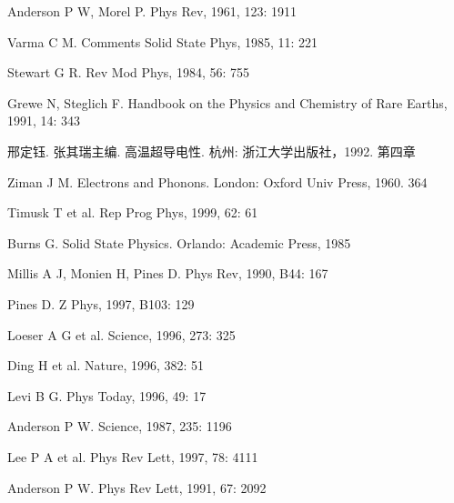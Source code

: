 \begin{canKao}
\begin{enumerate}[label={[\arabic*]}, leftmargin=2.2em, itemsep=0pt]
\item Anderson P W, Morel P. Phys Rev, 1961, 123: 1911
\item Varma C M. Comments Solid State Phys, 1985, 11: 221
\item Stewart G R. Rev Mod Phys, 1984, 56: 755
\item Grewe N, Steglich F. Handbook on the Physics and Chemistry of Rare Earths, 1991, 14: 343
\item 邢定钰. 张其瑞主编. 高温超导电性. 杭州: 浙江大学出版社，1992. 第四章
\item Ziman J M. Electrons and Phonons. London: Oxford Univ Press, 1960. 364
\item Timusk T et al. Rep Prog Phys, 1999, 62: 61
\item Burns G. Solid State Physics. Orlando: Academic Press, 1985
\item Millis A J, Monien H, Pines D. Phys Rev, 1990, B44: 167
\item Pines D. Z Phys, 1997, B103: 129
\item Loeser A G et al. Science, 1996, 273: 325
\item Ding H et al. Nature, 1996, 382: 51
\item Levi B G. Phys Today, 1996, 49: 17
\item Anderson P W. Science, 1987, 235: 1196
\item Lee P A et al. Phys Rev Lett, 1997, 78: 4111
\item Anderson P W. Phys Rev Lett, 1991, 67: 2092
\end{enumerate}
\end{canKao}
